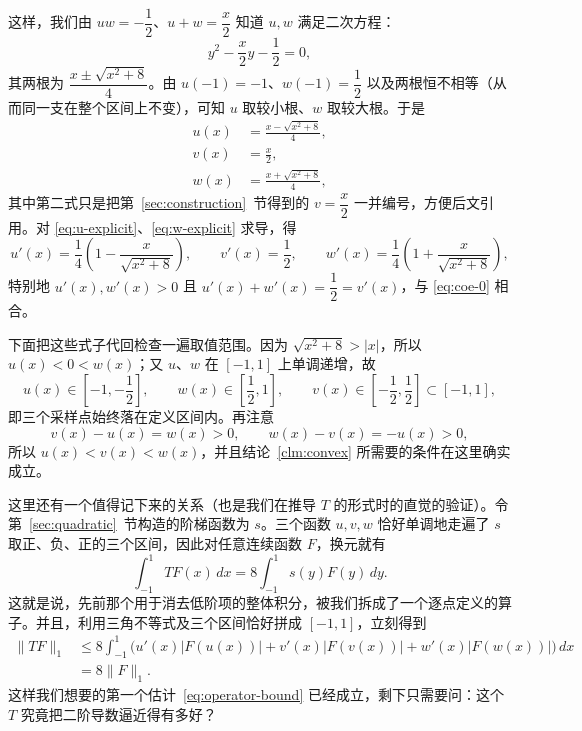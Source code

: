 \documentclass[UTF8,fontset=windows,a4paper,11pt]{ctexart}
\newcommand{\Lone}[1]{\lVert #1\rVert_1}
\begin{document}
这样，我们由 $uw=-\dfrac{1}{2}$、$u+w=\dfrac{x}{2}$ 知道 $u,w$ 满足二次方程：
\[
    y^2-\frac{x}{2}y-\frac{1}{2}=0,
\]
其两根为 $\dfrac{x\pm\sqrt{x^{2}+8}}{4}$。由 $u(-1)=-1$、$w(-1)=\dfrac12$ 以及两根恒不相等（从而同一支在整个区间上不变），可知 $u$ 取较小根、$w$ 取较大根。于是
\begin{align}
    u(x)&=\frac{x-\sqrt{x^{2}+8}}{4}, \label{eq:u-explicit}\\
    v(x)&=\frac{x}{2}, \label{eq:v-explicit}\\
    w(x)&=\frac{x+\sqrt{x^{2}+8}}{4}, \label{eq:w-explicit}
\end{align}
其中第二式只是把第~\ref{sec:construction}~节得到的 $v=\dfrac{x}{2}$ 一并编号，方便后文引用。对 \eqref{eq:u-explicit}、\eqref{eq:w-explicit} 求导，得
\begin{equation}
    u'(x)=\frac{1}{4}\left(1-\frac{x}{\sqrt{x^{2}+8}}\right),\qquad
    v'(x)=\frac{1}{2},\qquad
    w'(x)=\frac{1}{4}\left(1+\frac{x}{\sqrt{x^{2}+8}}\right),
    \label{eq:uvw-deriv}
\end{equation}
特别地 $u'(x),w'(x)>0$ 且 $u'(x)+w'(x)=\dfrac12=v'(x)$，与 \eqref{eq:coe-0} 相合。

下面把这些式子代回检查一遍取值范围。因为 $\sqrt{x^{2}+8}>|x|$，所以 $u(x)<0<w(x)$；又 $u$、$w$ 在 $[-1,1]$ 上单调递增，故
\[
    u(x)\in\left[-1,-\frac12\right],\qquad
    w(x)\in\left[\frac12,1\right],\qquad
    v(x)\in\left[-\frac12,\frac12\right]\subset[-1,1],
\]
即三个采样点始终落在定义区间内。再注意
\[
    v(x)-u(x)=w(x)>0,\qquad w(x)-v(x)=-u(x)>0,
\]
所以 $u(x)<v(x)<w(x)$，并且结论~\ref{clm:convex} 所需要的条件在这里确实成立。




这里还有一个值得记下来的关系（也是我们在推导 $T$ 的形式时的直觉的验证）。令第~\ref{sec:quadratic}~节构造的阶梯函数为 $s$。三个函数 $u,v,w$ 恰好单调地走遍了 $s$ 取正、负、正的三个区间，因此对任意连续函数 $F$，换元就有
\begin{equation}
    \int_{-1}^{1}TF(x)\,dx
    =8\int_{-1}^{1}s(y)F(y)\,dy.
    \label{eq:global-local}
\end{equation}
这就是说，先前那个用于消去低阶项的整体积分，被我们拆成了一个逐点定义的算子。并且，利用三角不等式及三个区间恰好拼成 $[-1,1]$，立刻得到
\begin{align}
    \Lone{TF}
    &\le 8\int_{-1}^{1}\bigl(u'(x)|F(u(x))|+v'(x)|F(v(x))|+w'(x)|F(w(x))|\bigr)\,dx\\
    &=8\Lone{F}.
    \label{eq:T-bound-proof}
\end{align}
这样我们想要的第一个估计~\eqref{eq:operator-bound} 已经成立，剩下只需要问：这个 $T$ 究竟把二阶导数逼近得有多好？
\end{document}
